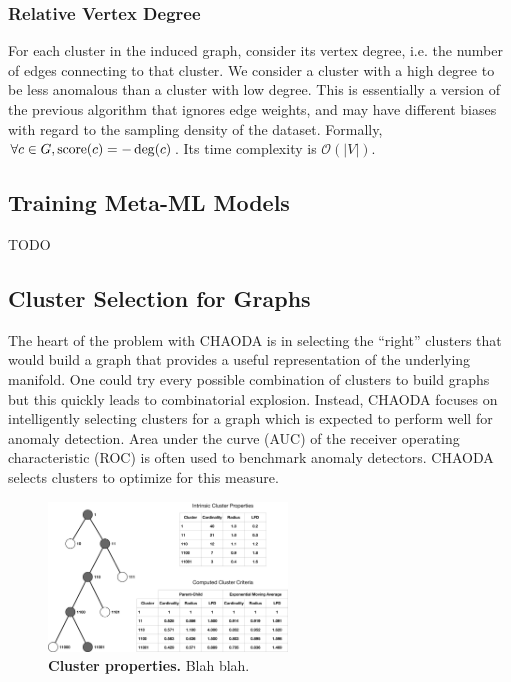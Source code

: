 \subsubsection{Relative Vertex Degree}
\label{subsubsec:methods:individual-algorithms:relative-vertex-degree}
For each cluster in the induced graph, consider its vertex degree, i.e. the number of edges connecting to that cluster.
We consider a cluster with a high degree to be less anomalous than a cluster with low degree.
This is essentially a version of the previous algorithm that ignores edge weights, and may have different biases with regard to the sampling density of the dataset.
Formally, $\forall c \in G, \operatorname{score}(c) = -\deg(c)$.
Its time complexity is $\mathcal{O}(|V|)$.


\subsection{Training Meta-ML Models}
\label{subsec:methods:training-meta-ml-models}
TODO


\subsection{Cluster Selection for Graphs}
\label{subsec:methods:cluster-selection-for-graphs}

The heart of the problem with CHAODA is in selecting the ``right'' clusters that would build a graph that provides a useful representation of the underlying manifold.
One could try every possible combination of clusters to build graphs but this quickly leads to combinatorial explosion.
Instead, CHAODA focuses on intelligently selecting clusters for a graph which is expected to perform well for anomaly detection.
Area under the curve (AUC) of the receiver operating characteristic (ROC) is often used to benchmark anomaly detectors.
CHAODA selects clusters to optimize for this measure.

\begin{figure}[ht!]
    \centering
    \includegraphics[width=2.5in]{images/chaoda-cluster-properties.pdf}
    \caption{\textbf{Cluster properties.}
        Blah blah.}
    \label{fig:methods:cluster-properties}
\end{figure}

